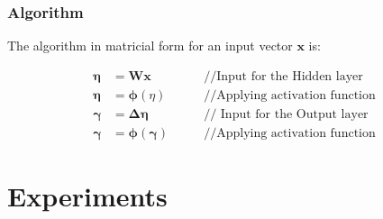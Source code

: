 \begin{frame}
  \frametitle{Algorithm}

The algorithm in matricial form for an input vector $\mathbf{x}$ is:

  \begin{align*}
    \mathbf{\eta} &= \mathbf{Wx} & \qquad \text{//Input for the
    Hidden layer }\\
    \mathbf{\eta} &= \mathbf{\phi}(\eta) & \qquad \text{//Applying activation
    function}\\
    \mathbf{\gamma} &= \mathbf{\Delta\eta} & \qquad \text{// Input for the
    Output layer}\\
    \mathbf{\gamma} &= \mathbf{\phi(\gamma)} & \qquad \text{//Applying
    activation function}
  \end{align*}

\end{frame}











\section{Experiments}
